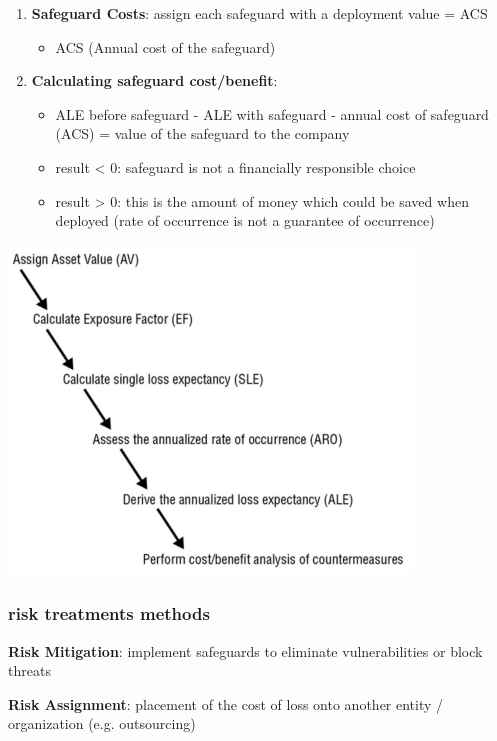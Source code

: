 \documentclass[11pt,twoside,landscape]{article}
\begin{document}
\begin{multicols}{4}
\begin{enumerate}
\item \textbf{Safeguard Costs}: assign each safeguard with a deployment value = ACS
\begin{itemize}
\item ACS (Annual cost of the safeguard)
\end{itemize}

\item \textbf{Calculating safeguard cost/benefit}:
\begin{itemize}
\item ALE before safeguard - ALE with safeguard - annual cost of safeguard (ACS) = value of the safeguard to the company
\item result < 0: safeguard is not a financially responsible choice
\item result > 0: this is the amount of money which could be saved when deployed (rate of occurrence is not a guarantee of occurrence)
\end{itemize}
\end{enumerate}

\begin{center}
\includegraphics[width=.9\linewidth]{img/quantitative_risk_analysis.png}
\end{center}

\subsubsection{risk treatments methods}
\label{sec:orgdda8653}
\textbf{Risk Mitigation}: implement safeguards to eliminate vulnerabilities or block threats

\textbf{Risk Assignment}: placement of the cost of loss onto another entity / organization (e.g. outsourcing)


\end{multicols}
\end{document}
